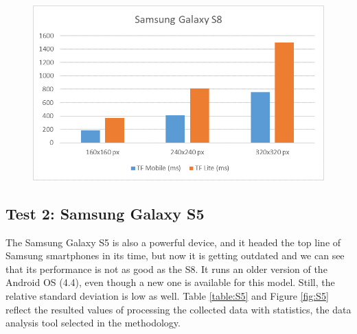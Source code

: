 \begin{figure}[p]
  \includegraphics[width=\linewidth]{img/charts/S8.png}
  \label{fig:S8}
\end{figure}

\subsection{Test 2: Samsung Galaxy S5}
The Samsung Galaxy S5 is also a powerful device, and it headed the top line of Samsung smartphones in its time, but now it is getting outdated and we can see that its performance is not as good as the S8. It runs an older version of the Android OS (4.4), even though a new one is available for this model. Still, the relative standard deviation is low as well. Table \ref{table:S5} and Figure \ref{fig:S5} reflect the resulted values of processing the collected data with statistics, the data analysis tool selected in the methodology. \\


